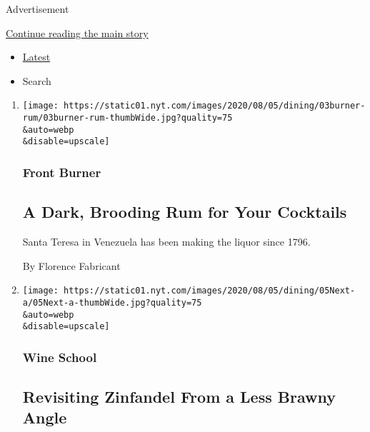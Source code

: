 Advertisement

\protect\hyperlink{after-mid1}{Continue reading the main story}

\begin{itemize}
\tightlist
\item
  \protect\hyperlink{stream-panel}{Latest}
\item
  Search
\end{itemize}

\begin{enumerate}
\def\labelenumi{\arabic{enumi}.}
\item
  \href{/2020/08/03/dining/drinks/santa-teresa-rum.html}{}

  \texttt{[image: https://static01.nyt.com/images/2020/08/05/dining/03burner-rum/03burner-rum-thumbWide.jpg?quality=75\\\&auto=webp\\\&disable=upscale]}

  \hypertarget{front-burner}{%
  \subsubsection{Front Burner}\label{front-burner}}

  \hypertarget{a-dark-brooding-rum-for-your-cocktails}{%
  \subsection{A Dark, Brooding Rum for Your
  Cocktails}\label{a-dark-brooding-rum-for-your-cocktails}}

  Santa Teresa in Venezuela has been making the liquor since 1796.

  By Florence Fabricant
\item
  \href{/2020/07/30/dining/drinks/wine-school-assignment-zinfandel.html}{}

  \texttt{[image: https://static01.nyt.com/images/2020/08/05/dining/05Next-a/05Next-a-thumbWide.jpg?quality=75\\\&auto=webp\\\&disable=upscale]}

  \hypertarget{wine-school-2}{%
  \subsubsection{Wine School}\label{wine-school-2}}

  \hypertarget{revisiting-zinfandel-from-a-less-brawny-angle}{%
  \subsection{Revisiting Zinfandel From a Less Brawny
  Angle}\label{revisiting-zinfandel-from-a-less-brawny-angle}}


\end{enumerate}
